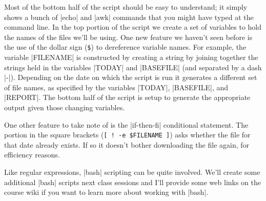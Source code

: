 Most of the bottom half of the script should be easy to understand; it simply shows a bunch of |echo| and |awk| commands that you might have typed at the command line. In the top portion of the script we create a set of variables to hold the names of the files we'll be using. One new feature we haven't seen before is the use of the dollar sign (\verb|$|) to dereference variable names.  For example, the variable |FILENAME| is constructed by creating a string by joining together the strings held in the variables |TODAY| and |BASEFILE| (and separated by a dash |-|). Depending on the date on which the script is run it generates a different set of file names, as specified by the variables |TODAY|, |BASEFILE|, and |REPORT|.  The bottom half of the script is setup to generate the appropriate output given those changing variables. 

One other feature to take note of is the |if-then-fi| conditional statement. The portion in the square brackets (\verb|[ ! -e $FILENAME ]|) asks whether the file for that date already exists. If so it doesn't bother downloading the file again, for efficiency reasons.

Like regular expressions, |bash| scripting can be quite involved. We'll create some additional |bash| scripts next class sessions and I'll provide some web links on the course wiki if you want to learn more about working with |bash|.


